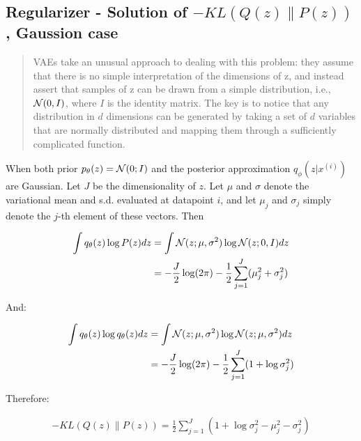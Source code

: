 \subsection{Regularizer - Solution of $- KL(Q(z)\|P(z))$, Gaussion case}
\begin{quotation}
    VAEs take an unusual approach to dealing with this problem: they assume that there is no simple interpretation
    of the dimensions of z, and instead assert that samples of z can be drawn from a simple distribution, i.e.,
    $\mathcal{N}(0, I)$, where $I$ is the identity matrix. The key is to notice that any distribution in $d$ dimensions
    can be generated by taking a set of $d$ variables that are normally distributed and mapping them through a sufficiently
    complicated function.
\end{quotation}

When both prior $p_{\theta}(z) = \mathcal{N}(0; I)$ and the posterior
approximation $q_{\phi}(z|x^{(i)})$ are Gaussian. Let
$J$ be the dimensionality of $z$. Let $\mu$ and $\sigma$ denote the
variational mean and s.d. evaluated at datapoint $i$, and let $\mu_j$ and
$\sigma_j$ simply denote the $j$-th element of these vectors. Then

\begin{equation}
    \begin{split}
        \int q_{\theta}(z) \log P(z) dz
        &= \int \mathcal{N}(z; \mu, \sigma^2) \log \mathcal{N}(z; 0, I) dz \\
        &= -\frac{J}{2} \log (2\pi) -\frac{1}{2} \sum^J_{j=1}(\mu^2_j + \sigma^2_j)
    \end{split}
\end{equation}

And:

\begin{equation}
    \begin{split}
        \int q_{\theta}(z) \log q_{\theta}(z) d z
        &= \int \mathcal{N}(z; \mu, \sigma^2) \log \mathcal{N}(z; \mu, \sigma^2) dz \\
        &= -\frac{J}{2} \log (2\pi) - \frac{1}{2} \sum^J_{j=1}(1 + \log \sigma^2_j)
    \end{split}
\end{equation}

Therefore:

\begin{equation}
    \begin{split}
        - KL(Q(z)\|P(z)) = \frac{1}{2}\sum^J_{j=1}(1 + \log\sigma_j^2 - \mu_j^2 - \sigma_j^2)
    \end{split}
\end{equation}


